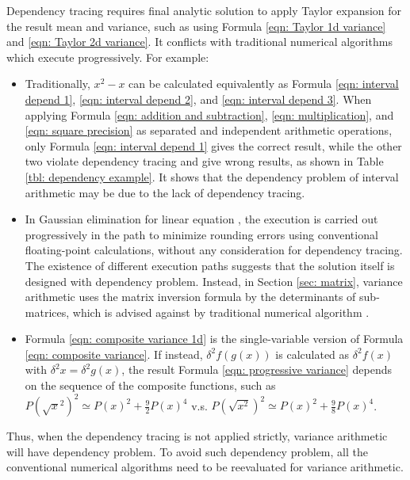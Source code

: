 \documentclass[twoside]{article}
\numberwithin{equation}{section}
\begin{document}
\fi

Dependency tracing requires final analytic solution to apply Taylor expansion for the result mean and variance, such as using Formula \eqref{eqn: Taylor 1d variance} and \eqref{eqn: Taylor 2d variance}.
It conflicts with traditional numerical algorithms which execute progressively.
For example:
\begin{itemize}
\item 
Traditionally, $x^2 - x$ can be calculated equivalently as Formula \eqref{eqn: interval depend 1}, \eqref{eqn: interval depend 2}, and \eqref{eqn: interval depend 3}.
When applying Formula \eqref{eqn: addition and subtraction}, \eqref{eqn: multiplication}, and \eqref{eqn: square precision} as separated and independent arithmetic operations, only Formula \eqref{eqn: interval depend 1} gives the correct result, while the other two violate dependency tracing and give wrong results, as shown in Table \ref{tbl: dependency example}.
It shows that the dependency problem of interval arithmetic \cite{Interval_Arithmetic} may be due to the lack of dependency tracing.

\item In Gaussian elimination for linear equation \cite{Numerical_Recipes}, the execution is carried out progressively in the path to minimize rounding errors using conventional floating-point calculations, without any consideration for dependency tracing.
The existence of different execution paths suggests that the solution itself is designed with dependency problem.
Instead, in Section \ref{sec: matrix}, variance arithmetic uses the matrix inversion formula by the determinants of sub-matrices, which is advised against by traditional numerical algorithm \cite{Numerical_Recipes}.

\item Formula \eqref{eqn: composite variance 1d} is the single-variable version of Formula \eqref{eqn: composite variance}.
If instead, $\delta^2 f(g(x))$ is calculated as $\delta^2 f(x)$ with $\delta^2 x = \delta^2 g(x)$, the result Formula \eqref{eqn: progressive variance} depends on the sequence of the composite functions, such as $P(\sqrt{x}^2)^2 \simeq P(x)^2 + \frac{9}{2} P(x)^4$ v.s. $P(\sqrt{x^2})^2 \simeq P(x)^2 + \frac{9}{8} P(x)^4$.
\end{itemize}
Thus, when the dependency tracing is not applied strictly, variance arithmetic will have dependency problem.
To avoid such dependency problem, all the conventional numerical algorithms need to be reevaluated for variance arithmetic.
\end{document}
